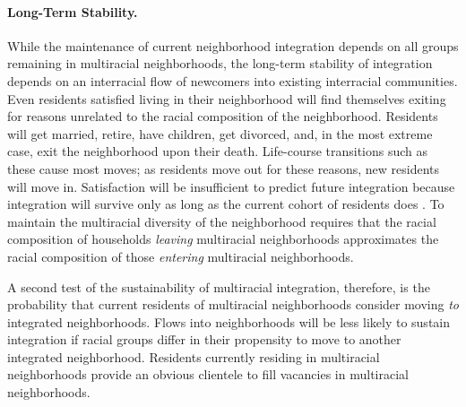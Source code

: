 \documentclass{baderart}
\begin{document}
\paragraph{Long-Term Stability.}\label{long-term-stability}

While the maintenance of current neighborhood integration depends on all groups remaining in multiracial neighborhoods, the long-term stability of integration depends on an interracial flow of newcomers into existing interracial communities. Even residents satisfied living in their neighborhood will find themselves exiting for reasons unrelated to the racial composition of the neighborhood. Residents will get married, retire, have children, get divorced, and, in the most extreme case, exit the neighborhood upon their death. Life-course transitions such as these cause most moves; as residents move out for these reasons, new residents will move in. Satisfaction will be insufficient to predict future integration because integration will survive only as long as the current cohort of residents does \citep[see, e.g., ][]{molotch_racial_1969, woldoff_white_2011}. To maintain the multiracial diversity of the neighborhood requires that the racial composition of households \emph{leaving} multiracial neighborhoods approximates the racial composition of those \emph{entering} multiracial neighborhoods.

A second test of the sustainability of multiracial integration, therefore, is the probability that current residents of multiracial neighborhoods consider moving \emph{to} integrated neighborhoods. Flows into neighborhoods will be less likely to sustain integration if racial groups differ in their propensity to move to another integrated neighborhood. Residents currently residing in multiracial neighborhoods provide an obvious clientele to fill vacancies in multiracial neighborhoods. 
\end{document}
